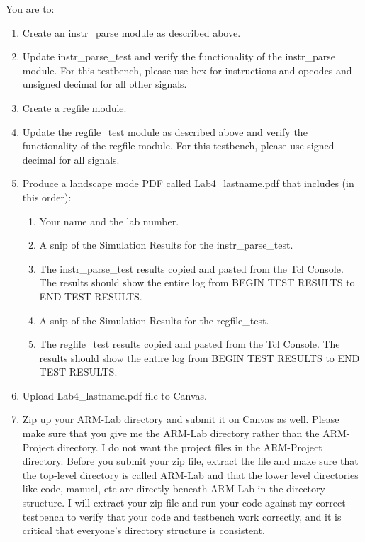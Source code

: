 You are to:
\begin{enumerate}
\item Create an instr\_parse module as described above.
\item Update instr\_parse\_test and verify the functionality of the instr\_parse module.  For this testbench, please use hex for instructions and opcodes and unsigned decimal for all other signals.
\item Create a regfile module.
\item Update the regfile\_test module as described above and verify the functionality of the regfile module.  For this testbench, please use signed decimal for all signals.
\item Produce a landscape mode PDF called Lab4\_lastname.pdf that includes (in this order):
\begin{enumerate}
	\item Your name and the lab number.
	\item A snip of the Simulation Results for the instr\_parse\_test.  
	\item The instr\_parse\_test results copied and pasted from the Tcl Console.  The results should show the entire log from BEGIN TEST RESULTS to END TEST RESULTS.
	\item A snip of the Simulation Results for the regfile\_test.    
	\item The regfile\_test results copied and pasted from the Tcl Console.  The results should show the entire log from BEGIN TEST RESULTS to END TEST RESULTS.
\end{enumerate}
\item Upload Lab4\_lastname.pdf file to Canvas.
\item Zip up your ARM-Lab directory and submit it on Canvas as well.  Please make sure that you give me the ARM-Lab directory rather than the ARM-Project directory.  I do not want the project files in the ARM-Project directory.  Before you submit your zip file, extract the file and make sure that the top-level directory is called ARM-Lab and that the lower level directories like code, manual, etc are directly beneath ARM-Lab in the directory structure.  I will extract your zip file and run your code against my correct testbench to verify that your code and testbench work correctly, and it is critical that everyone's directory structure is consistent.
\end{enumerate} 